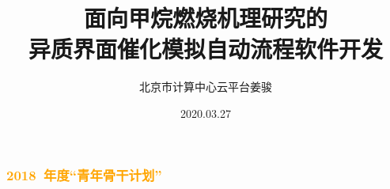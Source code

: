 \documentclass[cjk,slidestop,compress,mathserif,blue]{beamer}
\begin{document}

\title{面向甲烷燃烧机理研究的\\异质界面催化模拟自动流程软件开发}

\author[]{北京市计算中心\;云平台\:姜骏}
	
\institute[]{}
\date{\textrm{2020.03.27}}
\frame
{	
	\frametitle{\footnotesize{\textcolor{orange}{\textrm{2018~}年度“青年骨干计划”}}}
\titlepage
}

\section*{}
\end{document}

